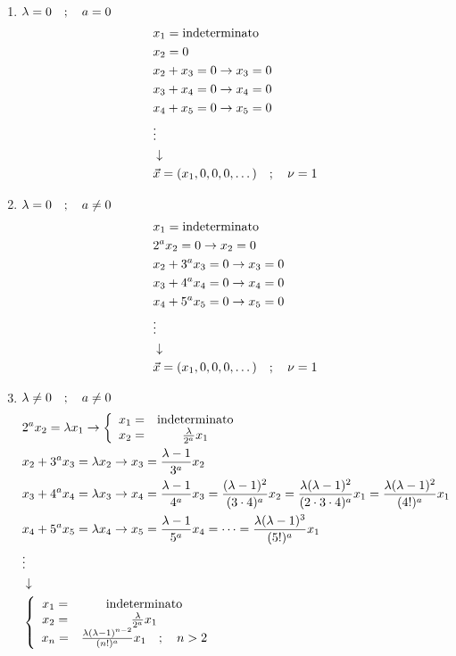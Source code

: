 \begin{enumerate}

	\item $\lambda = 0 \quad ; \quad a=0$
		\begin{align}
			&x_1 = \text{indeterminato}\\
			&x_2 = 0\\
			&x_2 + x_3 = 0 \to x_3 =0\\
			&x_3 + x_4 = 0 \to x_4 =0\\
			&x_4 + x_5 = 0 \to x_5=0\\
			&\vdots \nonumber \\ &\downarrow \nonumber \\
			&\vec{x} = (x_1, 0, 0, 0, \dots) \quad ; \quad \nu = 1
		\end{align}
		
	\item $\lambda = 0 \quad ; \quad a \neq 0$
		\begin{align}
			&x_1 = \text{indeterminato}\\
			&2^a x_2 = 0 \to x_2 = 0\\
			&x_2 + 3^a x_3 = 0 \to x_3 =0\\
			&x_3 + 4^a x_4 = 0 \to x_4 =0\\
			&x_4 + 5^a x_5 = 0 \to x_5=0\\
			&\vdots \nonumber \\ &\downarrow \nonumber \\
			&\vec{x} = (x_1, 0, 0, 0, \dots) \quad ; \quad \nu = 1
		\end{align}

	\item $\lambda \neq 0 \quad ; \quad a \neq 0$
		\begin{align}
			&2^ax_2 = \lambda x_1 \to \left\{ \begin{array}{cc} x_1 =& \text{indeterminato}\\ x_2 =& \frac{\lambda}{2^a} x_1 \end{array} \right.\\
			&x_2 + 3^a x_3 = \lambda x_2 \to x_3 = \frac{\lambda -1}{3^a} x_2 \\
			&x_3 + 4^a x_4 = \lambda x_3 \to x_4 = \frac{\lambda -1}{4^a} x_3 = \frac{(\lambda -1)^2}{(3\cdot4)^a} x_2  = \frac{\lambda(\lambda -1)^2 }{(2\cdot 3\cdot4)^a} x_1 =  \frac{\lambda(\lambda -1)^2 }{(4!)^a} x_1\\
			&x_4 + 5^a x_5 = \lambda x_4 \to x_5 = \frac{\lambda -1}{5^a} x_4 = \dots =  \frac{\lambda(\lambda -1)^3 }{(5!)^a} x_1\\
			&\vdots \nonumber \\ &\downarrow \nonumber \\
			&\left\{ \begin{array}{ccc} x_1 =& \text{indeterminato}\\ x_2 =& \frac{\lambda}{2^a} x_1\\ x_n =& \frac{\lambda(\lambda -1)^{n-2} }{(n!)^a} x_1 \quad ; \quad n>2 \end{array} \right.
		\end{align}


\end{enumerate}
